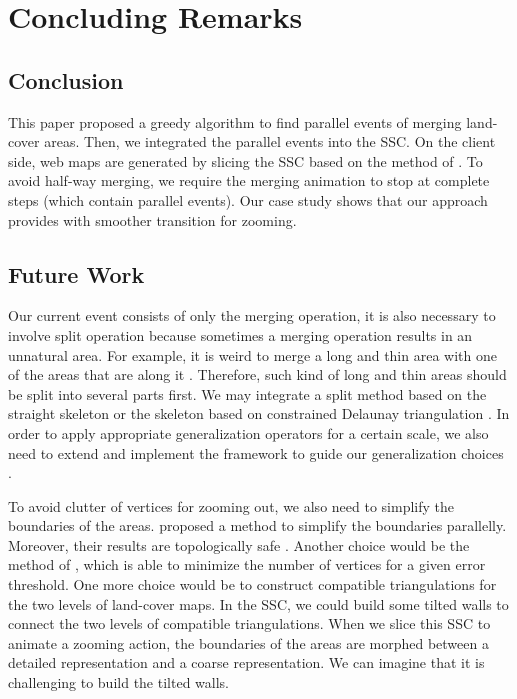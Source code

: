 \documentclass[ijgi,article,submit,moreauthors,pdftex]{Definitions/mdpi}
\begin{document}
\section{Concluding Remarks}
\label{sec:concluding_remarks}

\subsection{Conclusion}
This paper proposed a greedy algorithm to find parallel events of 
merging land-cover areas.
Then, we integrated the parallel events into the SSC. 
On the client side, web maps are generated by slicing the SSC
based on the method of \citet{Meijers2020Web}.
To avoid half-way merging, we require the merging animation 
to stop at complete steps (which contain parallel events).
Our case study shows that 
our approach provides with smoother transition for zooming.


\subsection{Future Work}



Our current event consists of only the merging operation,
it is also necessary to involve split operation
because sometimes a merging operation results in an unnatural area.
For example, it is weird to merge a long and thin area 
with one of the areas that are along it
\citep[see][]{Haunert2008Skeleton}.
Therefore, such kind of long and thin areas should be
split into several parts first.
We may integrate a split method based on the straight skeleton
\citep{Haunert2008Skeleton}
or the skeleton based on constrained Delaunay triangulation
\citep{Meijers2016Split}.
In order to apply appropriate generalization operators
for a certain scale,
we also need to extend and implement the framework 
to guide our generalization choices
\citep{Meijers2018Framework}.

To avoid clutter of vertices for zooming out, 
we also need to simplify the boundaries of the areas.
\citet{Meijers2011LineSimp} proposed a method 
to simplify the boundaries parallelly. 
Moreover, their results are topologically safe . 
Another choice would be the method of \citet{ImaiIri1988},
which is able to minimize the number of vertices 
for a given error threshold.
One more choice would be to construct compatible triangulations 
\citep[see][]{Peng2019Thesis}
for the two levels of land-cover maps.
In the SSC, we could build some tilted walls 
to connect the two levels of compatible triangulations.
When we slice this SSC to animate a zooming action,
the boundaries of the areas are morphed 
between a detailed representation and a coarse representation.
We can imagine that it is challenging to build the tilted walls.
\end{document}
